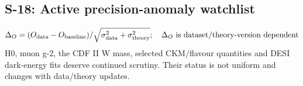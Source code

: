 \subsection*{S-18: Active precision-anomaly watchlist}
\begingroup\small
\begin{equation*}
\Delta_O=(O_{\rm data}-O_{\rm baseline})/\sqrt{\sigma_{\rm data}^2+\sigma_{\rm theory}^2};\allowbreak\quad \Delta_O\ \text{is dataset/theory-version dependent}
\end{equation*}
\endgroup
H0, muon g-2, the CDF II W mass, selected CKM/flavour quantities and DESI dark-energy fits deserve continued scrutiny. Their status is not uniform and changes with data/theory updates.
